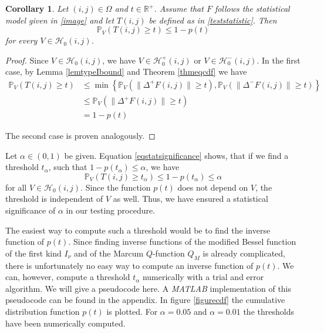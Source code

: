 \documentclass[a4paper,12pt]{article}
\newcommand{\norm}[1]{\lVert#1\rVert}
\theoremstyle{plain}
\newtheorem{corollary}[theorem]{Corollary}
\theoremstyle{definition}
\begin{document}
\begin{corollary}
	Let $(i, j) \in \Omega$ and $t \in \mathbb{R}^+$. Assume that $F$ follows the statistical model given in \eqref{image} and let $T(i, j)$ be defined as in \eqref{teststatistic}. Then
	\begin{equation}\label{eqstatsignificance}
		\mathbb{P}_V( T(i, j) \geq t ) \leq 1 - p(t)
	\end{equation}
	for every $V \in \mathcal{H}_0(i, j)$.
\end{corollary}
\begin{proof}
	Since $V \in \mathcal{H}_0(i, j)$, we have $V \in \mathcal{H}_0^+(i, j)$ or $V \in \mathcal{H}_0^-(i, j)$. In the first case, by Lemma \ref{lemtypeIbound} and Theorem \ref{thmeqcdf} we have
	\begin{align*}
		\mathbb{P}_V( T(i, j) \geq t ) &\leq \min \left\{ \mathbb{P}_V( \norm{\Delta^+ F(i, j)} \geq t ), \mathbb{P}_V( \norm{\Delta^- F(i, j)} \geq t ) \right\} \\
		&\leq \mathbb{P}_V( \norm{\Delta^+ F(i, j)} \geq t ) \\
		&= 1 - p(t)
	\end{align*}
	
	The second case is proven analogously.
\end{proof}

Let $\alpha \in (0, 1)$ be given. Equation \eqref{eqstatsignificance} shows, that if we find a threshold $t_\alpha$, such that $1 - p(t_\alpha) \leq \alpha$, we have
\begin{equation}
	\mathbb{P}_V(T(i, j) \geq t_\alpha) \leq 1 - p(t_\alpha) \leq \alpha
\end{equation}
for all $V \in \mathcal{H}_0(i, j)$. Since the function $p(t)$ does not depend on $V$, the threshold is independent of $V$ as well. Thus, we have ensured a statistical significance of $\alpha$ in our testing procedure.

The easiest way to compute such a threshold would be to find the inverse function of $p(t)$. Since finding inverse functions of the modified Bessel function of the first kind $I_\nu$ and of the Marcum $Q$-function $Q_M$ is already complicated, there is unfortunately no easy way to compute an inverse function of $p(t)$. We can, however, compute a threshold $t_\alpha$ numerically with a trial and error algorithm. We will give a pseudocode here. A \emph{MATLAB} implementation of this pseudocode can be found in the appendix. In figure \ref{figurecdf} the cumulative distribution function $p(t)$ is plotted. For $\alpha = 0.05$ and $\alpha = 0.01$ the thresholds have been numerically computed.\\
\end{document}
